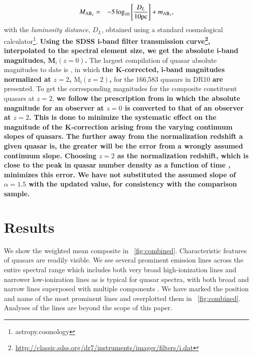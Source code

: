 \documentclass{aa}    %
\newcommand{\figref}[1]{\ref{fig:#1}}
\newcommand{\Fig}[1]{\figurename~\figref{#1}}
\newcommand{\fig}[1]{\Fig{#1}}
\newcommand{\eqlabel}[1]{\label{eq:#1}}
\newcommand{\sectlabel}[1]{\label{sect:#1}}
\begin{document}
\begin{eqnarray}\eqlabel{absmag}
M_{\textmd{AB}_x} &=& -5 \log_{10} \left[  \frac{D_L }{10 \mathrm{pc}}   \right]
+ m_{\textmd{AB}_x} ,
\end{eqnarray}
with the \textit{luminosity distance}, $D_L$,  obtained using a standard
cosmological calculator\footnote{astropy.cosmology}. \textbf{Using the SDSS i-band filter transmission curve\footnote{\url{http://classic.sdss.org/dr7/instruments/imager/filters/i.dat}}, interpolated to the spectral element size, we get the absolute i-band magnitudes, M$_i(z=0)$.}
The largest compilation of quasar absolute magnitudes to date is
\cite{Paris2014}, in which \textbf{the K-corrected, i-band magnitudes normalized at $z = 2$, $\mathrm{M_i (z=2)}$, } for the 166,583 quasars in DR10 \textbf{are}
presented. To get the corresponding magnitudes for the composite constituent
quasars at $z = 2$, \textbf{we follow the prescription from \cite{Richards2006b} in which the absolute magnitude for an observer at $z = 0$ is converted to that of an observer at $z = 2$. This is done to minimize the systematic effect on the magnitude of the K-correction arising from the varying continuum slopes of quasars. The further away from the normalization redshift a given quasar is, the greater will be the error from a wrongly assumed continuum slope. Choosing $z = 2$ as the normalization redshift, which is close to the peak in quasar number density as a function of time \citep{Richards2006b, Hopkins2007}, minimizes this error. We have not substituted the assumed slope of $\alpha
  = 1.5$ with the updated value, for consistency with the comparison sample.}




\section{Results}   \sectlabel{results}


We show the weighted mean composite in \fig{combined}. Characteristic features
of quasars are readily visible. We see several prominent emission lines across
the entire spectral range which includes both very broad high-ionization lines
and narrower low-ionization lines as is typical for quasar spectra, with both
broad and narrow lines superposed with multiple components \citep{Baldwin1995}.
We have marked the position and name of the most prominent lines and overplotted
them in \fig{combined}.  Analyses of the lines are beyond the scope of this
paper.
\end{document}
